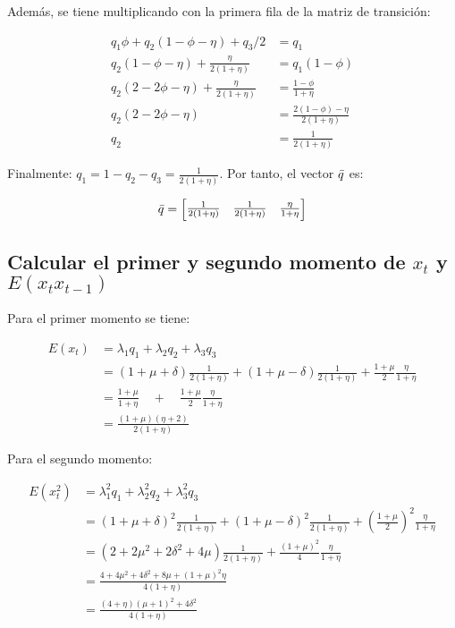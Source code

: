 \documentclass[12pt]{article}
\begin{document}
Además, se tiene multiplicando con la primera fila de la matriz de transición:

\begin{align*}
    q_1\phi + q_2(1-\phi-\eta) + q_3/2 &= q_1 \\
    q_2(1-\phi-\eta) + \frac{\eta}{2(1+\eta)} &= q_1(1-\phi) \\
    q_2(2-2\phi-\eta) + \frac{\eta}{2(1+\eta)} &= \frac{1-\phi}{1+\eta} \\
    q_2(2-2\phi-\eta) &= \frac{2(1-\phi)-\eta}{2(1+\eta)} \\
    q_2 &= \frac{1}{2(1+\eta)}
\end{align*}

Finalmente: $q_1 = 1 - q_2 - q_3 = \frac{1}{2(1+\eta)}$. Por tanto, el vector $\Bar{q}$ es:

$$
\Bar{q} = \begin{bmatrix}
        \frac{1}{2(1+\eta)} & \frac{1}{2(1+\eta)} & \frac{\eta}{1+\eta}
    \end{bmatrix}
$$

\subsection{Calcular el primer y segundo momento de $x_t$ y $E(x_t x_{t-1})$}

Para el primer momento se tiene:

\begin{align*}
    E(x_t)  &= \lambda_1 q_1 + \lambda_2 q_2 + \lambda_3 q_3 \\
            &= (1 + \mu + \delta)\frac{1}{2(1+\eta)}  + (1 + \mu - \delta)\frac{1}{2(1+\eta)} + 
                \frac{1+\mu}{2}\frac{\eta}{1+\eta} \\
            &= \frac{1+\mu}{1+\eta} \quad + \quad \frac{1+\mu}{2}\frac{\eta}{1+\eta}   \\
            &= \frac{(1+\mu)(\eta + 2)}{2(1+\eta)}
\end{align*}

Para el segundo momento:

\begin{align*}
    E(x_t^2)    &= \lambda_1^2 q_1 + \lambda_2^2 q_2 + \lambda_3^2 q_3 \\
                &= (1 + \mu + \delta)^2\frac{1}{2(1+\eta)}  + (1 + \mu - \delta)^2\frac{1}{2(1+\eta)} + 
                \left ( \frac{1+\mu}{2} \right )^2\frac{\eta}{1+\eta} \\
                &= (2 + 2\mu^2 +2\delta^2 + 4\mu)\frac{1}{2(1+\eta)} +   \frac{(1+\mu)^2}{4} \frac{\eta}{1+\eta} \\
                &= \frac{4 +4\mu^2 + 4\delta^2 + 8\mu + (1+\mu)^2 \eta}{4(1+\eta)} \\
                &= \frac{(4+\eta)(\mu+1)^2 + 4\delta^2}{4(1+\eta)}
\end{align*}
\end{document}
